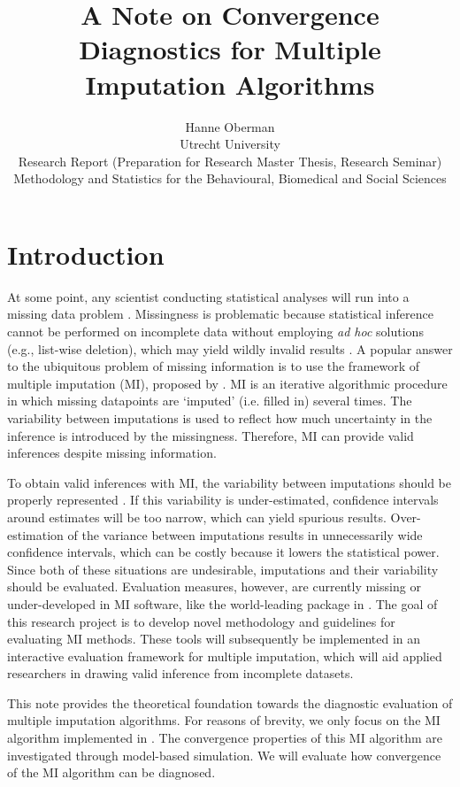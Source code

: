 \documentclass[article]{jss}
\author{Hanne Oberman\\Utrecht University \AND \\ Research Report (Preparation for Research Master Thesis, Research Seminar) \\ Methodology and Statistics for the Behavioural, Biomedical and Social Sciences}
\title{A Note on Convergence Diagnostics for Multiple Imputation Algorithms}
\begin{document}

\section{Introduction} \label{sec:intro} 

At some point, any scientist conducting statistical analyses will run into a missing data problem \citep{alli02}. Missingness is problematic because statistical inference cannot be performed on incomplete data without employing \emph{ad hoc} solutions (e.g., list-wise deletion), which may yield wildly invalid results \citep{buur18}. A popular answer to the ubiquitous problem of missing information is to use the framework of multiple imputation (MI), proposed by \cite{rubin87}. MI is an iterative algorithmic procedure in which missing datapoints are `imputed' (i.e. filled in) several times. The variability between imputations is used to reflect how much uncertainty in the inference is introduced by the missingness. Therefore, MI can provide valid inferences despite missing information. 

To obtain valid inferences with MI, the variability between imputations should be properly represented \citep{rubin87, buur18}. If this variability is under-estimated, confidence intervals around estimates will be too narrow, which can yield spurious results. Over-estimation of the variance between imputations results in unnecessarily wide confidence intervals, which can be costly because it lowers the statistical power. Since both of these situations are undesirable, imputations and their variability should be evaluated. Evaluation measures, however, are currently missing or under-developed in MI software, like the world-leading  package \citep{mice} in  \citep{R}. 
The goal of this research project is to develop novel methodology and guidelines for evaluating MI methods. These tools will subsequently be implemented in an interactive evaluation framework for multiple imputation, which will aid applied researchers in drawing valid inference from incomplete datasets. 

This note provides the theoretical foundation towards the diagnostic evaluation of %
multiple imputation algorithms. For reasons of brevity, we only focus on the MI algorithm implemented in  \citep{mice}. 
The convergence properties of this MI algorithm are investigated through model-based simulation\footnotemark.%
We will evaluate how convergence of the MI algorithm can be diagnosed.
\end{document}
